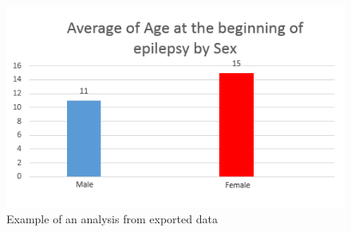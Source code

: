\documentclass[thesis=B,english]{FITthesis}[2012/10/20]
\begin{document}
\begin{figure}
	\centering
 	\includegraphics[width=1\textwidth]{images/chart.png}
 	\caption{Example of an analysis from exported data}
 	\label{fig:chart}
\end{figure}
\end{document}
